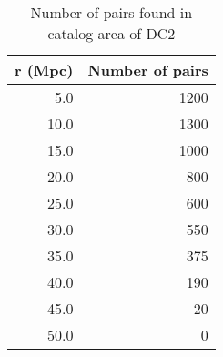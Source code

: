 \begin{table}
\begin{centering}
\begin{tabular}{|r|r|}
    \hline
    r (Mpc) &  Number of pairs \\
\hline
  5.0 &  1200 \\
 10.0 &  1300 \\
 15.0 &  1000 \\
 20.0 &   800 \\
 25.0 &   600 \\
 30.0 &   550 \\
 35.0 &   375 \\
 40.0 &   190 \\
 45.0 &    20 \\
 50.0 &     0 \\
\hline
\end{tabular}
\end{centering}
\caption{Number of pairs found in catalog area of DC2}
\label{tab:numpairscat}
\end{table}
